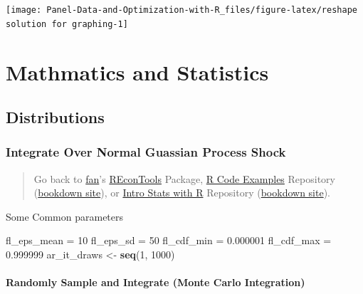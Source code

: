 \documentclass[
]{book}
\newenvironment{Shaded}{\begin{snugshade}}{\end{snugshade}}
\newcommand{\DecValTok}[1]{\textcolor[rgb]{0.00,0.00,0.81}{#1}}
\newcommand{\FloatTok}[1]{\textcolor[rgb]{0.00,0.00,0.81}{#1}}
\newcommand{\KeywordTok}[1]{\textcolor[rgb]{0.13,0.29,0.53}{\textbf{#1}}}
\newcommand{\NormalTok}[1]{#1}
\newcommand{\StringTok}[1]{\textcolor[rgb]{0.31,0.60,0.02}{#1}}
\begin{document}
\begin{center}\texttt{[image: Panel-Data-and-Optimization-with-R\_files/figure-latex/reshape solution for graphing-1]} \end{center}

\hypertarget{mathmatics-and-statistics}{%
\chapter{Mathmatics and Statistics}\label{mathmatics-and-statistics}}

\hypertarget{distributions}{%
\section{Distributions}\label{distributions}}

\hypertarget{integrate-over-normal-guassian-process-shock}{%
\subsection{Integrate Over Normal Guassian Process Shock}\label{integrate-over-normal-guassian-process-shock}}

\begin{quote}
Go back to \href{http://fanwangecon.github.io/}{fan}'s \href{https://fanwangecon.github.io/REconTools/}{REconTools} Package, \href{https://fanwangecon.github.io/R4Econ/}{R Code Examples} Repository (\href{https://fanwangecon.github.io/R4Econ/bookdown}{bookdown site}), or \href{https://fanwangecon.github.io/Stat4Econ/}{Intro Stats with R} Repository (\href{https://fanwangecon.github.io/Stat4Econ/bookdown}{bookdown site}).
\end{quote}

Some Common parameters

\begin{Shaded}
\begin{Highlighting}[]
\NormalTok{fl\_eps\_mean =}\StringTok{ }\DecValTok{10}
\NormalTok{fl\_eps\_sd =}\StringTok{ }\DecValTok{50}
\NormalTok{fl\_cdf\_min =}\StringTok{ }\FloatTok{0.000001}
\NormalTok{fl\_cdf\_max =}\StringTok{ }\FloatTok{0.999999}
\NormalTok{ar\_it\_draws \textless{}{-}}\StringTok{ }\KeywordTok{seq}\NormalTok{(}\DecValTok{1}\NormalTok{, }\DecValTok{1000}\NormalTok{)}
\end{Highlighting}
\end{Shaded}

\hypertarget{randomly-sample-and-integrate-monte-carlo-integration}{%
\subsubsection{Randomly Sample and Integrate (Monte Carlo Integration)}\label{randomly-sample-and-integrate-monte-carlo-integration}}
\end{document}

